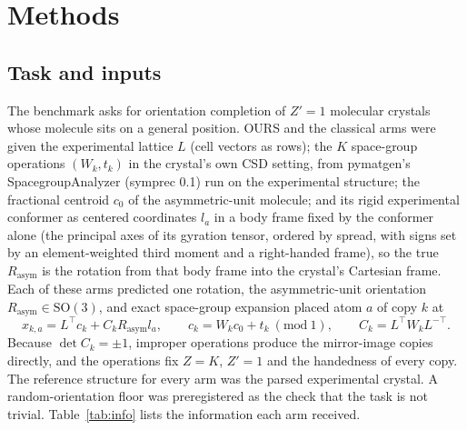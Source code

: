 \section{Methods}

\subsection{Task and inputs}

The benchmark asks for orientation completion of $Z'=1$ molecular crystals whose
molecule sits on a general position. OURS and the classical arms were given the
experimental lattice $L$ (cell vectors as rows); the $K$ space-group operations $(W_k,t_k)$ in
the crystal's own CSD setting, from pymatgen's SpacegroupAnalyzer (symprec
0.1)\cite{ong2013pymatgen,togo2024spglib} run on the experimental structure; the
fractional centroid $c_0$ of the asymmetric-unit molecule; and its rigid
experimental conformer as centered coordinates $l_a$ in a body frame fixed by the conformer
alone (the principal axes of its gyration tensor, ordered by spread, with signs set by an
element-weighted third moment and a right-handed frame), so the true $R_{\mathrm{asym}}$ is the
rotation from that body frame into the crystal's Cartesian frame. Each of these arms predicted one rotation,
the asymmetric-unit orientation $R_{\mathrm{asym}}\in\mathrm{SO}(3)$, and exact
space-group expansion placed atom $a$ of copy $k$ at
\begin{equation}
x_{k,a}=L^{\top}c_k+C_kR_{\mathrm{asym}}l_a,\qquad
c_k=W_kc_0+t_k\ (\mathrm{mod}\ 1),\qquad
C_k=L^{\top}W_kL^{-\top}.
\label{eq:expand}
\end{equation}
Because $\det C_k=\pm1$, improper operations produce the mirror-image copies
directly, and the operations fix $Z=K$, $Z'=1$ and the handedness of every copy.
The reference structure for every arm was the parsed experimental crystal.
A random-orientation floor was preregistered as the check that the task is not
trivial.
Table~\ref{tab:info} lists the information each arm received.

